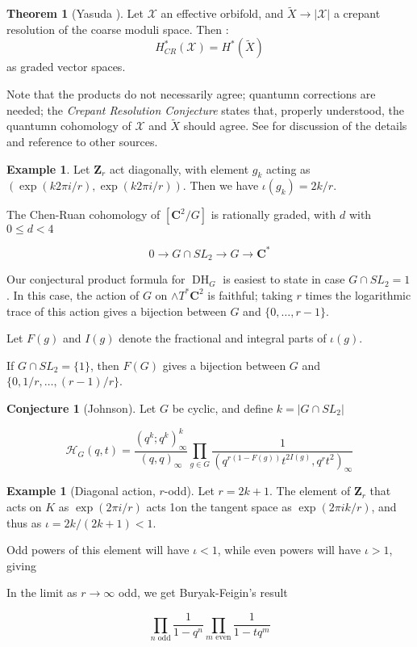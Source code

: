 \documentclass{amsart}[12pt]
\theoremstyle{definition}
\newtheorem{theorem}[dummy]{Theorem}
\newtheorem{example}[dummy]{Example}
\newtheorem{conjecture}[dummy]{Conjecture}
\newcommand{\Z}{\mathbf{Z}}
\newcommand{\C}{\mathbf{C}}
\DeclareMathOperator{\DC}{DH}
\begin{document}
\begin{theorem}[Yasuda \cite{yasuda}] \label{thm:yasuda}
Let $\mathcal{X}$ an effective orbifold, and $\widetilde{X}\to|\mathcal{X}|$ a crepant resolution of the coarse moduli space.  Then :
$$H_{CR}^*(\mathcal{X})=H^*(\widetilde{X})$$
as graded vector spaces.  
\end{theorem}

Note that the products do not necessarily agree; quantumn corrections are needed; the \emph{Crepant Resolution Conjecture} states that, properly understood, the quantumn cohomology of $\mathcal{X}$ and $\widetilde{X}$ should agree.  See \cite{CoatesRuan} for discussion of the details and reference to other sources.


\begin{example}
Let $\Z_r$ act diagonally, with element $g_k$ acting as $(\exp(k2\pi i/r),\exp(k2\pi i/r))$.  Then we have $\iota(g_k)=2k/r$.
\end{example}




The Chen-Ruan cohomology of $[\C^2/G]$ is rationally graded, with $d$ with $0\leq d < 4$


$$0\to G\cap SL_2\to G \to \C^*$$








Our conjectural product formula for $\DC_G$ is easiest to state in case $G\cap SL_2=1$.  In this case, the action of $G$ on $\wedge T^*\C^2$ is faithful; taking $r$ times the logarithmic trace of this action gives a bijection between $G$ and $\{0,\dots, r-1\}$.


Let $F(g)$ and $I(g)$ denote the fractional and integral parts of $\iota(g)$. 

If $G\cap SL_2=\{1\}$, then $F(G)$ gives a bijection between $G$ and $\{0, 1/r,\dots, (r-1)/r\}$.
\begin{conjecture}[Johnson]
Let $G$ be cyclic, and define $k=|G\cap SL_2|$

$$\mathcal{H}_G(q,t)= \frac{(q^k;q^k)^k_\infty}{(q,q)_\infty} \prod_{g\in G}\frac{1}{(q^{r(1-F(g))} t^{2I(g)},q^rt^2)_\infty}$$

\end{conjecture}


\begin{example}[Diagonal action, $r$-odd]
Let $r=2k+1$.   The element of $\Z_r$ that acts on $K$ as $\exp(2\pi i/r)$ acts 1on the tangent space as $\exp(2\pi i k/r)$, and thus as $\iota=2k/(2k+1)<1$.  

Odd powers of this element will have $\iota<1$, while even powers will have $\iota>1$, giving 

In the limit as $r\to\infty$ odd, we get Buryak-Feigin's result

$$\prod_{n \text{ odd}} \frac{1}{1-q^n}\prod_{m \text{ even}}\frac{1}{1-tq^m}$$
\end{example}
\end{document}
